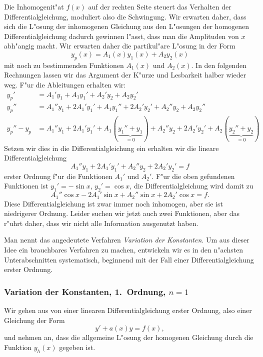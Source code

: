 Die Inhomogenit"at $f(x)$ auf der rechten Seite steuert das Verhalten
der Differentialgleichung, moduliert also die Schwingung.
Wir erwarten daher, dass sich die L"osung der inhomogenen Gleichung
aus den L"osungen der homogenen Differentialgleichung dadurch gewinnen
l"asst, dass man die Amplituden von $x$ abh"angig macht.
Wir erwarten daher die partikul"are L"osung in der Form
\[
y_p(x)=A_1(x)y_1(x)+A_2y_2(x)
\]
mit noch zu bestimmenden Funktionen $A_1(x)$ und $A_2(x)$.
In den folgenden Rechnungen lassen wir das Argument der K"urze und Lesbarkeit
halber wieder weg.
F"ur die Ableitungen erhalten wir:
\begin{align*}
y_p'
&=
A_1'y_1+A_1y_1'+A_2'y_2+A_2y_2'
\\
y_p''
&=
A_1''y_1+2A_1'y_1'+A_1y_1''+2A_2'y_2'+A_2''y_2+A_2y_2''
\\
y_p''-y_p
&=
A_1''y_1+2A_1'y_1'+A_1(\underbrace{y_1''+y_1}_{=0})
+
A_2''y_2+2A_2'y_2'+A_2(\underbrace{y_2''+y_2}_{=0})
\end{align*}
Setzen wir dies in die Differentialgleichung ein erhalten wir die
lineare Differentialgleichung 
\[
A_1''y_1+2A_1'y_1' +A_2''y_2+2A_2'y_2'=f
\]
erster Ordnung f"ur die Funktionen $A_1'$ und $A_2'$.
F"ur die oben gefundenen Funktionen ist $y_1'=-\sin x$, $y_2'=\cos x$,
die Differentialgleichung wird damit zu
\[
A_1''\cos x -2A_1'\sin x +A_2''\sin x+2A_2'\cos x=f.
\]
Diese Differentialgleichung ist zwar immer noch inhomogen, aber sie
ist niedrigerer Ordnung.
Leider suchen wir jetzt auch zwei Funktionen, aber das r"uhrt daher, dass
wir nicht alle Information ausgenutzt haben.

Man nennt das angedeutete Verfahren {\em Variation der Konstanten}.
Um aus dieser Idee ein brauchbares Verfahren zu machen, entwickeln wir es
in den n"achsten Unterabschnitten systematisch, beginnend mit der Fall
einer Differentialgleichung erster Ordnung.

\subsubsection{Variation der Konstanten, 1.~Ordnung, $n=1$}
Wir gehen aus von einer linearen Differentialgleichung erster Ordnung,
also einer Gleichung der Form
\[
y' + a(x)y=f(x),
\]
und nehmen an, dass die allgemeine L"osung der homogenen Gleichung
durch die Funktion $y_h(x)$ gegeben ist.

